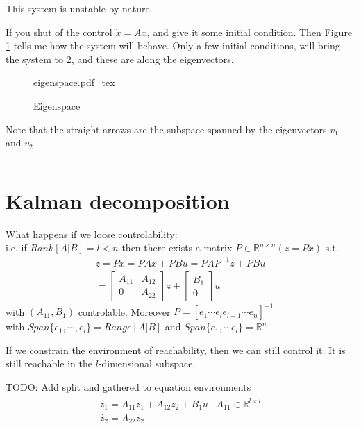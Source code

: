 \documentclass[a4paper]{article}
\newcommand{\incfig}[2][1]{%
    \def\svgwidth{#1\columnwidth}
    {#2.pdf_tex}
}
\begin{document}
This system is unstable by nature. 

\vspace{5pt}

If you shut of the control $ \dot{x} = Ax $, and give it some initial condition. Then Figure \ref{fig:eigenspace} tells me how the system will behave. Only a few initial conditions, will bring the system to 2, and these are along the eigenvectors.

\begin{figure}[ht]
    \centering
    \incfig[1]{eigenspace}
    \caption{Eigenspace}
    \label{fig:eigenspace}
\end{figure}


Note that the straight arrows are the subspace spanned by the eigenvectors $ v_1 $ and $ v_2 $


\vspace{5pt}
\hrule
\vspace{5pt}

\section{Kalman decomposition}
What happens if we loose controlability: \\
i.e. if $ Rank[A|B] = l < n $ then there exists a matrix $ P \in \mathbb{R}^{n \times n } (z = Px)  $ s.t. 
 \[
	 \begin{gathered}
\dot{z} = P \dot{x} = P A x + P B u = P A P^{-1} z + P B u \\ = \begin{bmatrix}
A_{11} & A_{12} \\
0 & A_{22}
\end{bmatrix} z + \begin{bmatrix}
B_1 \\
0
\end{bmatrix} u
	 \end{gathered}
\] 
with $ (A_{11}, B_1) $ controlable. Moreover $ P = [e_1 \cdots e_l  e_{l+1} \cdots e_n]^{-1} $ \\ with $ Span\{e_1, \cdots, e_l \} = Range[A|B]$ and $ Span\{e_1, \cdots e_l\} = \mathbb{R}^{n} $

If we constrain the environment of reachability, then we can still control it. It is still reachable in the $ l$-dimensional subspace.


TODO: Add split and gathered to equation environments
\begin{equation}
	\begin{split}
	\begin{gathered}
		\dot{z_1} = A_{11} z_1 + A_{12} z_2 + B_1 u \hspace{10pt} A_{11} \in \mathbb{R}^{l \times l}  \\
	\dot{z_2} = A_{22} z_2
	\end{gathered}
	\end{split}
\end{equation}
\end{document}
